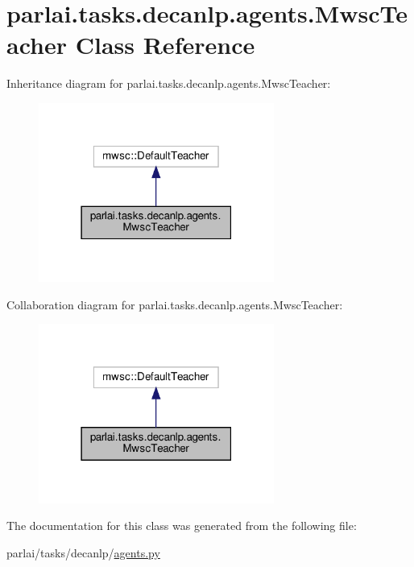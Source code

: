 \hypertarget{classparlai_1_1tasks_1_1decanlp_1_1agents_1_1MwscTeacher}{}\section{parlai.\+tasks.\+decanlp.\+agents.\+Mwsc\+Teacher Class Reference}
\label{classparlai_1_1tasks_1_1decanlp_1_1agents_1_1MwscTeacher}


Inheritance diagram for parlai.\+tasks.\+decanlp.\+agents.\+Mwsc\+Teacher\+:
\nopagebreak
\begin{figure}[H]
\begin{center}
\leavevmode
\includegraphics[width=219pt]{classparlai_1_1tasks_1_1decanlp_1_1agents_1_1MwscTeacher__inherit__graph}
\end{center}
\end{figure}


Collaboration diagram for parlai.\+tasks.\+decanlp.\+agents.\+Mwsc\+Teacher\+:
\nopagebreak
\begin{figure}[H]
\begin{center}
\leavevmode
\includegraphics[width=219pt]{classparlai_1_1tasks_1_1decanlp_1_1agents_1_1MwscTeacher__coll__graph}
\end{center}
\end{figure}


The documentation for this class was generated from the following file\+:\begin{DoxyCompactItemize}
\item 
parlai/tasks/decanlp/\hyperlink{parlai_2tasks_2decanlp_2agents_8py}{agents.\+py}\end{DoxyCompactItemize}
